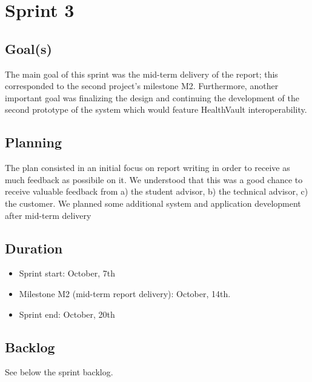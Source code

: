 

\chapter{Sprint 3}
\label{Sprint0}

\section{Goal(s)}

The main goal of this sprint was the mid-term delivery of the report; this corresponded to
the second project's milestone M2. Furthermore, another important goal was finalizing the design and continuing
the development of the second prototype of the system which would feature HealthVault interoperability.

\section{Planning}

The plan consisted in an initial focus on report writing in order to receive as much
feedback as possibile on it. We understood that this was a good chance to receive
valuable feedback from a) the student advisor, b) the technical advisor, c) the customer.
We planned some additional system and application development after mid-term delivery

\section{Duration}
\begin{itemize}
\item Sprint start:  October, 7th
\item Milestone M2 (mid-term report delivery): October, 14th.
\item Sprint end: October, 20th
\end{itemize}

\section{Backlog}
See below the sprint backlog.

